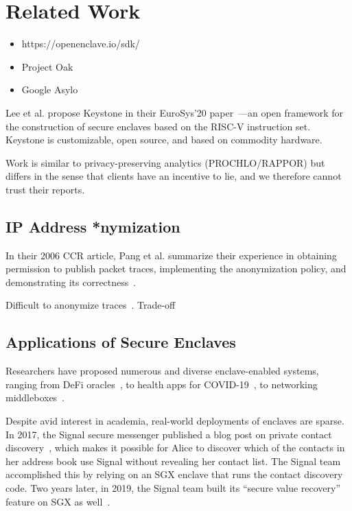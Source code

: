 \section{Related Work}
\label{sec:related-work}

\begin{itemize}
    \item https://openenclave.io/sdk/
    \item Project Oak
    \item Google Asylo
\end{itemize}

Lee et al. propose Keystone in their EuroSys'20 paper~\cite{Lee2020a}---an open
framework for the construction of secure enclaves based on the RISC-V
instruction set.  Keystone is customizable, open source, and based on commodity
hardware.

Work is similar to privacy-preserving analytics (PROCHLO/RAPPOR) but differs in the sense that clients have an incentive to lie, and we therefore cannot trust their reports.

\subsection{IP Address *nymization}


In their 2006 CCR article, Pang et al. summarize their experience in obtaining permission to publish packet traces, implementing the anonymization policy, and demonstrating its correctness~\cite{Pang06a}.

Difficult to anonymize traces~\cite{Burkhart10a}. Trade-off~\cite{Mohammady15a}

\subsection{Applications of Secure Enclaves}

Researchers have proposed numerous and diverse enclave-enabled systems, ranging from DeFi oracles~\cite{Zhang16a}, to health apps for COVID-19~\cite{Mailthody21a}, to networking middleboxes~\cite{Han17a}.

Despite avid interest in academia, real-world deployments of enclaves are sparse.  In 2017, the Signal secure messenger published a blog post on private contact discovery~\cite{Marlinspike17a}, which makes it possible for Alice to discover which of the contacts in her address book use Signal without revealing her contact list.  The Signal team accomplished this by relying on an SGX enclave that runs the contact discovery code.  Two years later, in 2019, the Signal team built its ``secure value recovery'' feature on SGX as well~\cite{Lund19a}.

